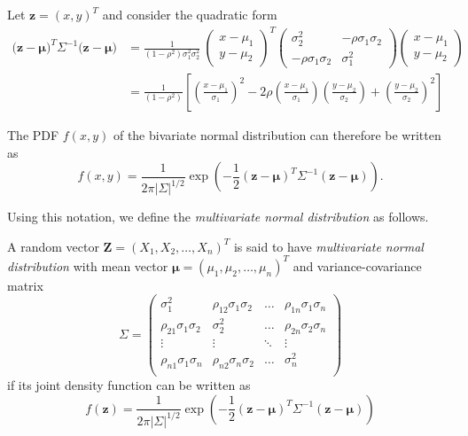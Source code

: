 Let $\mathbf{z} = (x,y)^T$ and consider the quadratic form 
\begin{align*}
\big(\mathbf{z}-\mathbf{\mu})^T \Sigma^{-1}(\mathbf{z}-\mathbf{\mu}\big) 
	& = 	\frac{1}{(1-\rho^2)\sigma^2_1\sigma^2_2}\ 
			\begin{pmatrix} x-\mu_1 \\ y-\mu_2	\end{pmatrix}^T
			\begin{pmatrix} \sigma^2_2 & -\rho\sigma_1\sigma_2 \\ -\rho\sigma_1\sigma_2 & \sigma^2_1 \end{pmatrix}
			\begin{pmatrix} x-\mu_1 \\ y-\mu_2	\end{pmatrix} \\
	& = \frac{1}{(1-\rho^2)}\left[\left(\frac{x-\mu_1}{\sigma_1}\right)^2
			 -2\rho\left(\frac{x-\mu_1}{\sigma_1}\right)\left(\frac{y-\mu_2}{\sigma_2}\right) 
			 	+\left(\frac{y-\mu_2}{\sigma_2}\right)^2\right]
\end{align*}

The PDF $f(x,y)$ of the bivariate normal distribution can therefore be written as
\[
f(x,y) = \frac{1}{2\pi|\Sigma|^{1/2}}\exp\left(-\frac{1}{2}(\mathbf{z}-\mathbf{\mu})^T \Sigma^{-1} (\mathbf{z}-\mathbf{\mu})\right).
\]		

Using this notation, we define the \emph{multivariate normal distribution} as follows.



\begin{definition}
A random vector $\mathbf{Z}=(X_1,X_2,\ldots,X_n)^T$ is said to have \emph{multivariate normal distribution} with mean vector $\mathbf{\mu}= (\mu_1,\mu_2,\ldots,\mu_n)^T$ and variance-covariance matrix
\[
\Sigma			= \begin{pmatrix} 
	\sigma^2_1		 			& \rho_{12}\sigma_1\sigma_2  	& \ldots & \rho_{1n}\sigma_1\sigma_n \\ 
	\rho_{21}\sigma_1\sigma_2 	& \sigma^2_2					& \ldots & \rho_{2n}\sigma_2\sigma_n \\
	\vdots						& \vdots						& \ddots & \vdots \\
	\rho_{n1}\sigma_1\sigma_n		 	& \rho_{n2}\sigma_n\sigma_2	& \ldots & \sigma^2_n \\
	\end{pmatrix}
\]
if its joint density function can be written as
\[
f(\mathbf{z}) = \frac{1}{2\pi|\Sigma|^{1/2}}\exp\left(-\frac{1}{2}(\mathbf{z}-\mathbf{\mu})^T \Sigma^{-1} (\mathbf{z}-\mathbf{\mu})\right)
\]		
\end{definition}

